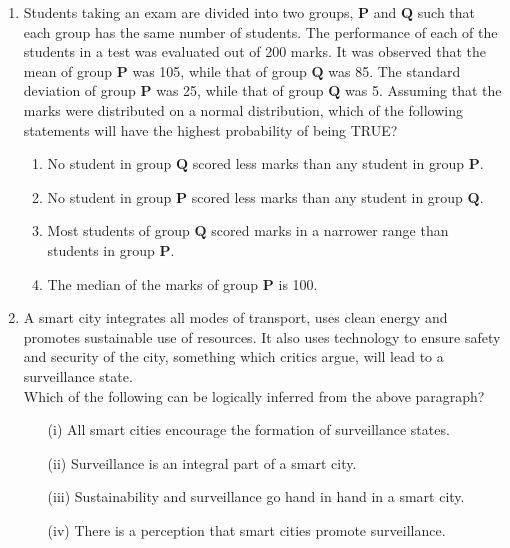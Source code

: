 \documentclass[journal,12pt,onecolumn]{IEEEtran}
\theoremstyle{remark}
\begin{document}
\begin{enumerate}
\item Students taking an exam are divided into two groups, $\mathbf{P}$ and $\mathbf{Q}$ such that each group has the same number of students. The performance of each of the students in a test was evaluated out of 200 marks. It was observed that the mean of group $\mathbf{P}$ was 105, while that of group $\mathbf{Q}$ was 85. The standard deviation of group $\mathbf{P}$ was 25, while that of group $\mathbf{Q}$ was 5. Assuming that the marks were distributed on a normal distribution, which of the following statements will have the highest probability of being TRUE?
 \hfill{}
\begin{enumerate}
\item No student in group $\mathbf{Q}$ scored less marks than any student in group $\mathbf{P}$.
\item No student in group $\mathbf{P}$ scored less marks than any student in group $\mathbf{Q}$.
\item Most students of group $\mathbf{Q}$ scored marks in a narrower range than students in group $\mathbf{P}$.
\item The median of the marks of group $\mathbf{P}$ is 100.
\end{enumerate}

\item A smart city integrates all modes of transport, uses clean energy and promotes sustainable use of resources. It also uses technology to ensure safety and security of the city, something which critics argue, will lead to a surveillance state.\\
Which of the following can be logically inferred from the above paragraph?
\begin{itemize}
\item [(i)] All smart cities encourage the formation of surveillance states.
\item [(ii)] Surveillance is an integral part of a smart city.
\item [(iii)] Sustainability and surveillance go hand in hand in a smart city.
\item [(iv)] There is a perception that smart cities promote surveillance.
\end{itemize}
\hfill{}
\begin{enumerate}
\end{enumerate}


\end{enumerate}
\end{document}
